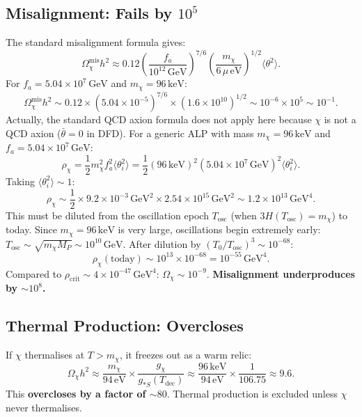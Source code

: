 \documentclass[11pt]{article}
\theoremstyle{definition}
\theoremstyle{remark}
\newcommand{\keV}{\,\mathrm{keV}}
\newcommand{\GeV}{\,\mathrm{GeV}}
\newcommand{\eV}{\,\mathrm{eV}}
\newcommand{\MP}{M_P}
\begin{document}
\subsection{Misalignment: Fails by $10^5$}

The standard misalignment formula gives:
\begin{equation}
  \Omega_\chi^\mathrm{mis} h^2
  \approx 0.12 \left(\frac{f_a}{10^{12}\GeV}\right)^{7/6}
  \left(\frac{m_\chi}{6\,\mu\eV}\right)^{1/2}
  \langle\theta^2\rangle.
\end{equation}
For $f_a = 5.04 \times 10^7\GeV$ and $m_\chi = 96\keV$:
\begin{equation}
  \Omega_\chi^\mathrm{mis} h^2
  \sim 0.12 \times (5.04 \times 10^{-5})^{7/6} \times (1.6 \times 10^{10})^{1/2}
  \sim 10^{-6} \times 10^5 \sim 10^{-1}.
\end{equation}
Actually, the standard QCD axion formula does not apply here because $\chi$
is not a QCD axion ($\bar\theta = 0$ in DFD). For a generic ALP with mass
$m_\chi = 96\keV$ and $f_a = 5.04 \times 10^7\GeV$:
\begin{equation}
  \rho_\chi = \frac{1}{2} m_\chi^2 f_a^2 \langle\theta_i^2\rangle
  = \frac{1}{2} (96\keV)^2 (5.04 \times 10^7\GeV)^2 \langle\theta_i^2\rangle.
\end{equation}
Taking $\langle\theta_i^2\rangle \sim 1$:
\begin{equation}
  \rho_\chi \sim \frac{1}{2} \times 9.2 \times 10^{-3}\GeV^2 \times 2.54 \times 10^{15}\GeV^2
  \sim 1.2 \times 10^{13}\GeV^4.
\end{equation}
This must be diluted from the oscillation epoch $T_\mathrm{osc}$
(when $3H(T_\mathrm{osc}) = m_\chi$) to today. Since $m_\chi = 96\keV$
is very large, oscillations begin extremely early:
$T_\mathrm{osc} \sim \sqrt{m_\chi \MP} \sim 10^{10}\GeV$.
After dilution by $(T_0/T_\mathrm{osc})^3 \sim 10^{-68}$:
\begin{equation}
  \rho_\chi(\text{today}) \sim 10^{13} \times 10^{-68} = 10^{-55}\GeV^4.
\end{equation}
Compared to $\rho_\mathrm{crit} \sim 4 \times 10^{-47}\GeV^4$:
$\Omega_\chi \sim 10^{-9}$. \textbf{Misalignment underproduces by $\sim 10^8$.}

\subsection{Thermal Production: Overcloses}

If $\chi$ thermalises at $T > m_\chi$, it freezes out as a warm relic:
\begin{equation}
  \Omega_\chi h^2 \approx \frac{m_\chi}{94\eV} \times \frac{g_\chi}{g_{*S}(T_\mathrm{dec})}
  \approx \frac{96\keV}{94\eV} \times \frac{1}{106.75} \approx 9.6.
\end{equation}
This \textbf{overcloses by a factor of $\sim 80$}. Thermal production is
excluded unless $\chi$ never thermalises.
\end{document}
